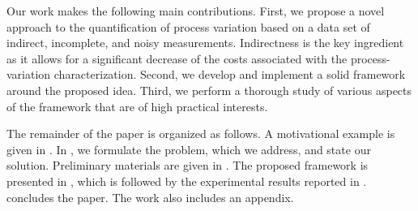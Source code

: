 Our work makes the following main contributions. First, we propose a novel approach to the quantification of process variation based on a data set of indirect, incomplete, and noisy measurements. Indirectness is the key ingredient as it allows for a significant decrease of the costs associated with the process-variation characterization.
Second, we develop and implement a solid framework around the proposed idea. Third, we perform a thorough study of various aspects of the framework that are of high practical interests.

The remainder of the paper is organized as follows. A motivational example is given in . In , we formulate the problem, which we address, and state our solution. Preliminary materials are given in . The proposed framework is presented in , which is followed by the experimental results reported in .  concludes the paper. The work also includes an appendix.

